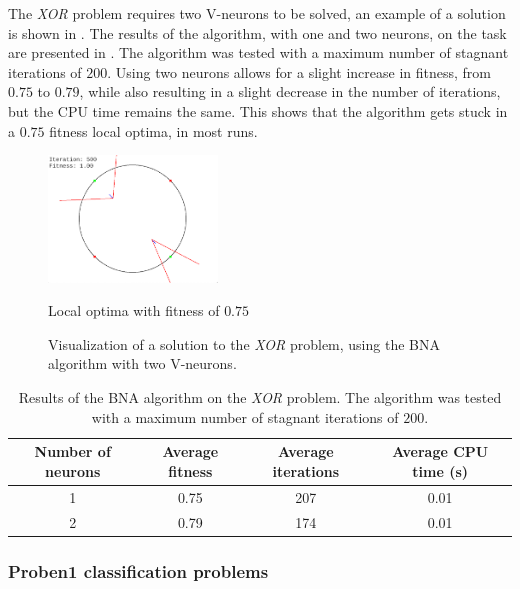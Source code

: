 The \textit{XOR} problem requires two V-neurons to be solved, an example of a solution is shown in . The results of the algorithm, with one and two neurons, on the task are
presented in . The algorithm was tested with a maximum number of stagnant iterations of $200$. Using two neurons allows for a slight increase in fitness, from $0.75$ to $0.79$,
while also resulting in a slight decrease in the number of iterations, but the CPU time remains the same. This shows that the algorithm gets stuck in a $0.75$ fitness local optima, in most runs.

\begin{figure}
    \centering
        \centering
        \includegraphics[width=0.4\textwidth]{Pictures/bna-xor}
       \caption{Local optima with fitness of $0.75$}
    \caption{Visualization of a solution to the \textit{XOR} problem, using the BNA algorithm with two V-neurons.}
    \label{fig:bna_xor_visual}
\end{figure}

\begin{table}
    \caption{Results of the BNA algorithm on the \textit{XOR} problem. The algorithm was tested with a maximum number of stagnant iterations of $200$.}
    \centering
    \label{tab:bna_xor}
    \begin{tabular}{ |c|c|c|c| }
        \hline
        Number of neurons & Average fitness & Average iterations & Average CPU time (s) \\
        \hline
        1 & 0.75 & 207 & 0.01 \\
        \hline
        2 & 0.79 & 174 & 0.01 \\
        \hline\hline
    \end{tabular}
\end{table}

\subsubsection{Proben1 classification problems}

